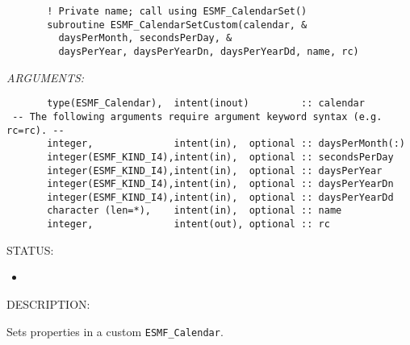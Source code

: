  
\begin{verbatim}       ! Private name; call using ESMF_CalendarSet()
       subroutine ESMF_CalendarSetCustom(calendar, &
         daysPerMonth, secondsPerDay, &
         daysPerYear, daysPerYearDn, daysPerYearDd, name, rc)
 \end{verbatim}{\em ARGUMENTS:}
\begin{verbatim}       type(ESMF_Calendar),  intent(inout)         :: calendar
 -- The following arguments require argument keyword syntax (e.g. rc=rc). --
       integer,              intent(in),  optional :: daysPerMonth(:)
       integer(ESMF_KIND_I4),intent(in),  optional :: secondsPerDay
       integer(ESMF_KIND_I4),intent(in),  optional :: daysPerYear
       integer(ESMF_KIND_I4),intent(in),  optional :: daysPerYearDn
       integer(ESMF_KIND_I4),intent(in),  optional :: daysPerYearDd
       character (len=*),    intent(in),  optional :: name
       integer,              intent(out), optional :: rc
 \end{verbatim}
{\sf STATUS:}
   \begin{itemize}
   \item{}
   \end{itemize}
  
{\sf DESCRIPTION:\\ }


       Sets properties in a custom {\tt ESMF\_Calendar}.
  
